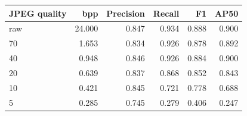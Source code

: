 \begin{tabular}{lrrrrr}
\toprule
JPEG quality & bpp & Precision & Recall & F1 & AP50 \\
\midrule
raw & 24.000 & 0.847 & 0.934 & 0.888 & 0.900 \\
70 & 1.653 & 0.834 & 0.926 & 0.878 & 0.892 \\
40 & 0.948 & 0.846 & 0.926 & 0.884 & 0.900 \\
20 & 0.639 & 0.837 & 0.868 & 0.852 & 0.843 \\
10 & 0.421 & 0.845 & 0.721 & 0.778 & 0.688 \\
5 & 0.285 & 0.745 & 0.279 & 0.406 & 0.247 \\
\bottomrule
\end{tabular}
